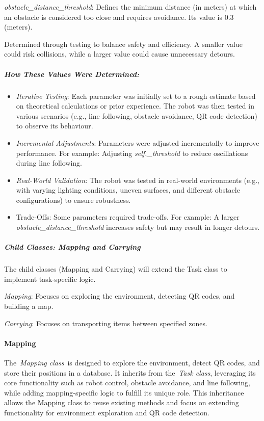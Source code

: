 \documentclass[../../main]{subfiles}
\begin{document}
\emph{obstacle\_distance\_threshold}: Defines the minimum distance (in
meters) at which an obstacle is considered too close and requires
avoidance. Its value is 0.3 (meters).

Determined through testing to balance safety and efficiency. A smaller
value could risk collisions, while a larger value could cause
unnecessary detours.

\subparagraph{How These Values Were Determined:}

\begin{itemize}
\item
  \emph{Iterative Testing}: Each parameter was initially set to a rough
  estimate based on theoretical calculations or prior experience. The
  robot was then tested in various scenarios (e.g., line following,
  obstacle avoidance, QR code detection) to observe its behaviour.
\item
  \emph{Incremental Adjustments}: Parameters were adjusted incrementally
  to improve performance. For example: Adjusting \emph{self.\_threshold}
  to reduce oscillations during line following.
\item
  \emph{Real-World Validation}: The robot was tested in real-world
  environments (e.g., with varying lighting conditions, uneven surfaces,
  and different obstacle configurations) to ensure robustness.
\item
  Trade-Offs: Some parameters required trade-offs. For example: A larger
  \\ \emph{obstacle\_distance\_threshold} increases safety but may result
  in longer detours.
\end{itemize}

\subparagraph{Child Classes: Mapping and Carrying}

The child classes (Mapping and Carrying) will extend the Task class to
implement task-specific logic.

\emph{Mapping}: Focuses on exploring the environment, detecting QR
codes, and building a map.

\emph{Carrying}: Focuses on transporting items between specified zones.

\paragraph{Mapping}

The~\emph{Mapping class}~is designed to explore the environment, detect
QR codes, and store their positions in a database. It inherits from
the~\emph{Task class}, leveraging its core functionality such as robot
control, obstacle avoidance, and line following, while adding
mapping-specific logic to fulfill its unique role. This inheritance
allows the Mapping class to reuse existing methods and focus on
extending functionality for environment exploration and QR code
detection.
\end{document}

